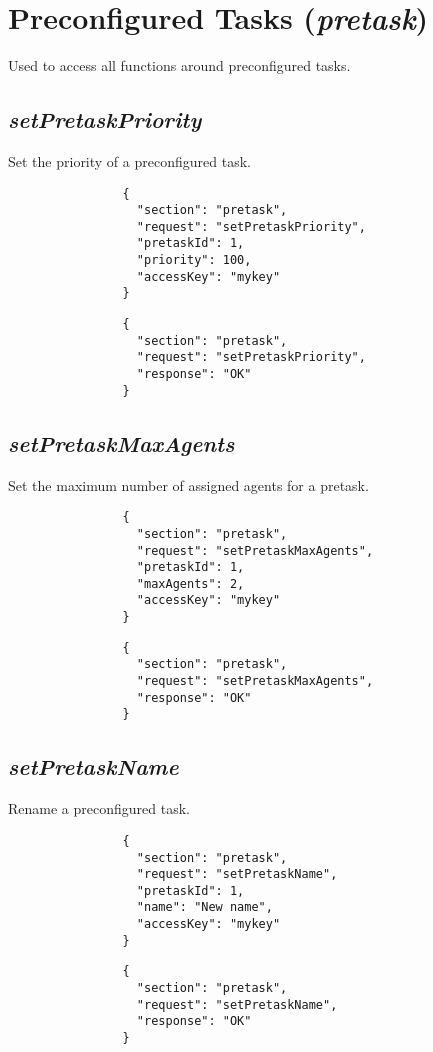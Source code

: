 \section*{Preconfigured Tasks (\textit{pretask})}
		Used to access all functions around preconfigured tasks. 
		\subsection*{\textit{setPretaskPriority}}
			Set the priority of a preconfigured task.
			{
				\color{blue}
				\begin{verbatim}
				{
				  "section": "pretask",
				  "request": "setPretaskPriority",
				  "pretaskId": 1,
				  "priority": 100,
				  "accessKey": "mykey"
				}
				\end{verbatim}
			}
			{
				\color{OliveGreen}
				\begin{verbatim}
				{
				  "section": "pretask",
				  "request": "setPretaskPriority",
				  "response": "OK"
				}
				\end{verbatim}
			}
		\subsection*{\textit{setPretaskMaxAgents}}
			Set the maximum number of assigned agents for a pretask.
			{
				\color{blue}
				\begin{verbatim}
				{
				  "section": "pretask",
				  "request": "setPretaskMaxAgents",
				  "pretaskId": 1,
				  "maxAgents": 2,
				  "accessKey": "mykey"
				}
				\end{verbatim}
			}
			{
				\color{OliveGreen}
				\begin{verbatim}
				{
				  "section": "pretask",
				  "request": "setPretaskMaxAgents",
				  "response": "OK"
				}
				\end{verbatim}
			}
		\subsection*{\textit{setPretaskName}}
			Rename a preconfigured task.
			{
				\color{blue}
				\begin{verbatim}
				{
				  "section": "pretask",
				  "request": "setPretaskName",
				  "pretaskId": 1,
				  "name": "New name",
				  "accessKey": "mykey"
				}
				\end{verbatim}
			}
			{
				\color{OliveGreen}
				\begin{verbatim}
				{
				  "section": "pretask",
				  "request": "setPretaskName",
				  "response": "OK"
				}
				\end{verbatim}
			}
